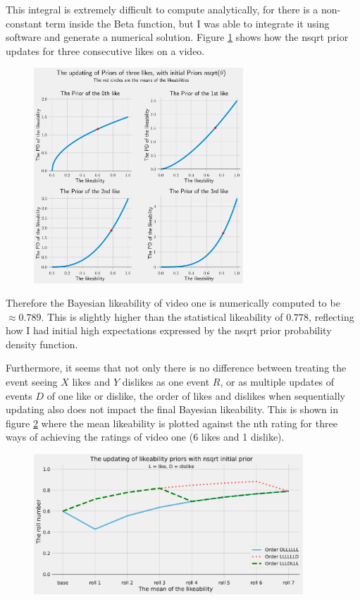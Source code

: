 \documentclass[a4paper,11pt]{article}
\begin{document}
This integral is extremely difficult to compute analytically, for there is a non-constant term inside the Beta function, but I was able to integrate it using software and generate a numerical solution. Figure \ref{fig:up_nsqrt} shows how the nsqrt prior updates for three consecutive likes on a video.

\begin{figure}[H]
    \centering
    \includegraphics[width=0.7\textwidth]{assets/nsqrt_updating_priors.png}
    \caption{}
    \label{fig:up_nsqrt}
\end{figure}

Therefore the Bayesian likeability of video one is numerically computed to be $\approx 0.789$. This is slightly higher than the statistical likeability of $0.778$, reflecting how I had initial high expectations expressed by the nsqrt prior probability density function.

Furthermore, it seems that not only there is no difference between treating the event seeing $X$ likes and $Y$ dislikes as one event $R$, or as multiple updates of events $D$ of one like or dislike, the order of likes and dislikes when sequentially updating also does not impact the final Bayesian likeability. This is shown in figure \ref{fig:nsqrt_incre} where the mean likeability is plotted against the nth rating for three ways of achieving the ratings of video one (6 likes and 1 dislike).

\begin{figure}[H]
    \centering
    \includegraphics[width=0.9\textwidth]{assets/nsqrt_incre.png}
    \caption{}
    \label{fig:nsqrt_incre}
\end{figure}
\end{document}
